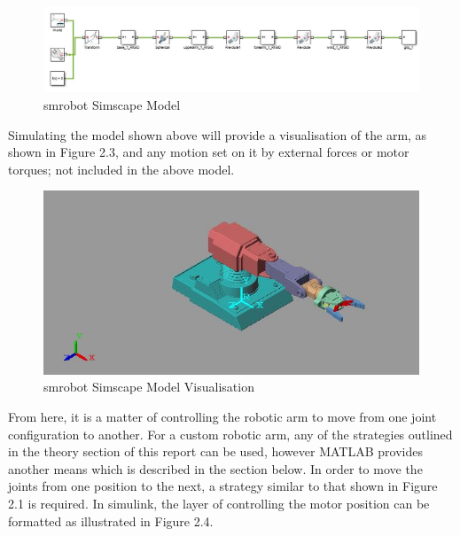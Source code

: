 \documentclass[12pt,openany,a4paper]{book}
\begin{document}
\begin{center}
\begin{figure}[htb]
  \includegraphics[width=1.1\linewidth]{simscape_robotic_arm.jpg}
\caption{smrobot Simscape Model}
\end{figure}
\end{center}

Simulating the model shown above will provide a visualisation of the arm, as shown in Figure 2.3, and any motion set on it by external forces or motor torques; not included in the above model.

\clearpage

\begin{center}
\begin{figure}[htb]
  \includegraphics[width=\linewidth]{simscape_robotic_arm_model.jpg}
\caption{smrobot Simscape Model Visualisation}
\end{figure}
\end{center}



From here, it is a matter of controlling the robotic arm to move from one joint configuration to another. For a custom robotic arm, any of the strategies outlined in the theory section of this report can be used, however MATLAB provides another means which is described in the section below. In order to move the joints from one position to the next, a strategy similar to that shown in Figure 2.1 is required. In simulink, the layer of controlling the motor position can be formatted as illustrated in Figure 2.4.
\end{document}
